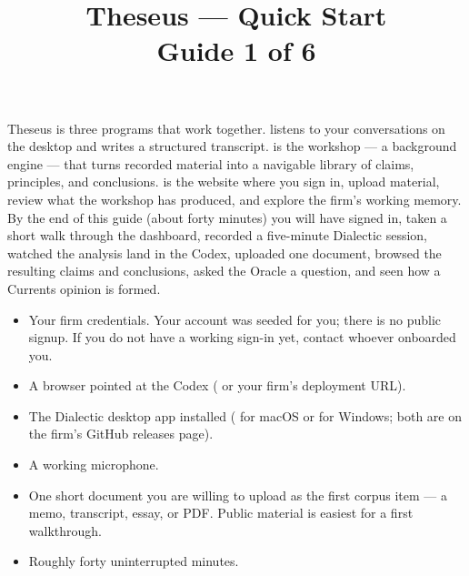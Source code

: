 \documentclass[11pt]{article}
\title{\sffamily\bfseries Theseus --- Quick Start\\[2pt]\large Guide 1 of 6}
\date{}
\author{}
\begin{document}
\maketitle
\thispagestyle{empty}

\begin{tldr}
Theseus is three programs that work together.  listens to
your conversations on the desktop and writes a structured transcript.
 is the workshop --- a background engine --- that turns
recorded material into a navigable library of claims, principles, and
conclusions.  is the website where you sign in,
upload material, review what the workshop has produced, and explore the
firm's working memory. By the end of this guide (about forty minutes)
you will have signed in, taken a short walk through the dashboard,
recorded a five-minute Dialectic session, watched the analysis land in
the Codex, uploaded one document, browsed the resulting claims and
conclusions, asked the Oracle a question, and seen how a Currents
opinion is formed.
\end{tldr}

\begin{youwillneed}
\begin{itemize}[leftmargin=*,itemsep=0.2em,topsep=0.2em]
  \item Your firm credentials. Your account was seeded for you; there is
        no public signup. If you do not have a working sign-in yet,
        contact whoever onboarded you.
  \item A browser pointed at the Codex ( or
        your firm's deployment URL).
  \item The Dialectic desktop app installed ( for
        macOS or  for Windows; both are on
        the firm's GitHub releases page).
  \item A working microphone.
  \item One short document you are willing to upload as the first
        corpus item --- a memo, transcript, essay, or PDF. Public
        material is easiest for a first walkthrough.
  \item Roughly forty uninterrupted minutes.
\end{itemize}
\end{youwillneed}
\end{document}
